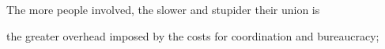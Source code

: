 The more
people involved, the slower and stupider their union is

the greater overhead imposed by the costs for coordination and
bureaucracy;
